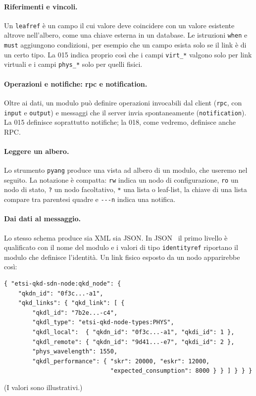 \paragraph{Riferimenti e vincoli.}
Un \texttt{leafref} è un campo il cui valore deve coincidere con un valore
esistente altrove nell'albero, come una chiave esterna in un database. Le
istruzioni \texttt{when} e \texttt{must} aggiungono condizioni, per esempio
che un campo esista solo se il link è di un certo tipo. La 015 indica
proprio così che i campi \texttt{virt\_*} valgono solo per link virtuali e
i campi \texttt{phys\_*} solo per quelli fisici.

\paragraph{Operazioni e notifiche: rpc e notification.}
Oltre ai dati, un modulo può definire operazioni invocabili dal client
(\texttt{rpc}, con \texttt{input} e \texttt{output}) e messaggi che il
server invia spontaneamente (\texttt{notification}). La 015 definisce
soprattutto notifiche; la 018, come vedremo, definisce anche RPC.

\paragraph{Leggere un albero.}
Lo strumento \texttt{pyang} produce una vista ad albero di un modulo, che
useremo nel seguito. La notazione è compatta: \texttt{rw} indica un nodo di
configurazione, \texttt{ro} un nodo di stato, \texttt{?} un nodo
facoltativo, \texttt{*} una lista o leaf-list, la chiave di una lista
compare tra parentesi quadre e \texttt{-{}-{}-n} indica una notifica.

\paragraph{Dai dati al messaggio.}
Lo stesso schema produce sia XML sia JSON. In JSON~\cite{rfc7951} il primo
livello è qualificato con il nome del modulo e i valori di tipo
\texttt{identityref} riportano il modulo che definisce l'identità. Un link
fisico esposto da un nodo apparirebbe così:
\begin{lstlisting}
{ "etsi-qkd-sdn-node:qkd_node": {
    "qkdn_id": "0f3c...-a1",
    "qkd_links": { "qkd_link": [ {
        "qkdl_id": "7b2e...-c4",
        "qkdl_type": "etsi-qkd-node-types:PHYS",
        "qkdl_local":  { "qkdn_id": "0f3c...-a1", "qkdi_id": 1 },
        "qkdl_remote": { "qkdn_id": "9d41...-e7", "qkdi_id": 2 },
        "phys_wavelength": 1550,
        "qkdl_performance": { "skr": 20000, "eskr": 12000,
                              "expected_consumption": 8000 } } ] } } }
\end{lstlisting}
(I valori sono illustrativi.)

